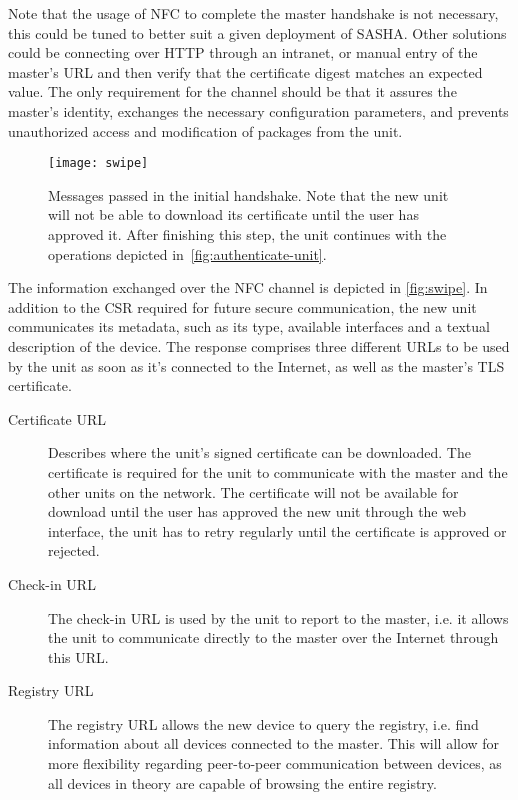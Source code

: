 Note that the usage of NFC to complete the master handshake is not necessary, this could be tuned to better suit a given deployment of SASHA. Other solutions could be connecting over HTTP through an intranet, or manual entry of the master's URL and then verify that the certificate digest matches an expected value. The only requirement for the channel should be that it assures the master's identity, exchanges the necessary configuration parameters, and prevents unauthorized access and modification of packages from the unit.

\begin{figure}[ht]
    \centering
    \texttt{[image: swipe]}
    \caption{Messages passed in the initial handshake. Note that the new unit will not be able to download its certificate until the user has approved it. After finishing this step, the unit continues with the operations depicted in~\autoref{fig:authenticate-unit}.}
    \label{fig:swipe}
\end{figure}

The information exchanged over the NFC channel is depicted in \autoref{fig:swipe}. In addition to the CSR required for future secure communication, the new unit communicates its metadata, such as its type, available interfaces and a textual description of the device. The response comprises three different URLs to be used by the unit as soon as it's connected to the Internet, as well as the master's TLS certificate.

\begin{description}
\item[Certificate URL]
    Describes where the unit's signed certificate can be downloaded. The certificate is required for the unit to communicate with the master and the other units on the network. The certificate will not be available for download until the user has approved the new unit through the web interface, the unit has to retry regularly until the certificate is approved or rejected.
\item[Check-in URL]
    The check-in URL is used by the unit to report to the master, i.e. it allows the unit to communicate directly to the master over the Internet through this URL.
\item[Registry URL]
    The registry URL allows the new device to query the registry, i.e. find information about all devices connected to the master. This will allow for more flexibility regarding peer-to-peer communication between devices, as all devices in theory are capable of browsing the entire registry.
\end{description}

